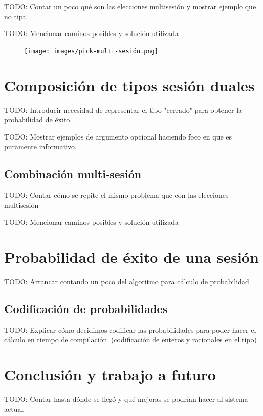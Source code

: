 \begin{frame}{\insertsubsection}
	TODO: Contar un poco qué son las elecciones multisesión y mostrar ejemplo que no tipa.
\end{frame}

\begin{frame}{\insertsubsection}
	TODO: Mencionar caminos posibles y solución utilizada
	\begin{figure}
		\centering
		\texttt{[image: images/pick-multi-sesión.png]}
	\end{figure}
\end{frame}

\section{Composición de tipos sesión duales}

\begin{frame}{\insertsection}
	TODO: Introducir necesidad de representar el tipo "cerrado" para obtener la probabilidad de éxito. 
\end{frame}

\begin{frame}{\insertsection}
	TODO: Mostrar ejemplos de argumento opcional haciendo foco en que es puramente informativo.
\end{frame}

\subsection{Combinación multi-sesión}

\begin{frame}{\insertsubsection}
	TODO: Contar cómo se repite el mismo problema que con las elecciones multisesión
\end{frame}

\begin{frame}{\insertsubsection}
	TODO: Mencionar caminos posibles y solución utilizada
\end{frame}

\section{Probabilidad de éxito de una sesión}
\begin{frame}{\insertsection}
	TODO: Arrancar contando un poco del algoritmo para cálculo de probabilidad
\end{frame}

\subsection{Codificación de probabilidades}
\begin{frame}{\insertsubsection}
	TODO: Explicar cómo decidimos codificar las probabilidades para poder hacer el cálculo en tiempo de compilación. (codificación de enteros y racionales en el tipo)
\end{frame}

\section{Conclusión y trabajo a futuro}
\begin{frame}{\insertsection}
	TODO: Contar hasta dónde se llegó y qué mejoras se podrían hacer al sistema actual.
\end{frame}
